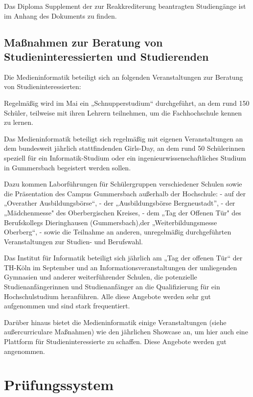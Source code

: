Das Diploma Supplement der zur Reakkrediterung beantragten Studiengänge
ist im Anhang des Dokuments zu finden.

\section{Maßnahmen zur Beratung von Studieninteressierten und
Studierenden}\label{mauxdfnahmen-zur-beratung-von-studieninteressierten-und-studierenden}

Die Medieninformatik beteiligt sich an folgenden Veranstaltungen zur
Beratung von Studieninteressierten:

Regelmäßig wird im Mai ein „Schnupperstudium`` durchgeführt, an dem rund
150 Schüler, teilweise mit ihren Lehrern teilnehmen, um die
Fachhochschule kennen zu lernen.

Das Medieninformatik beteiligt sich regelmäßig mit eigenen
Veranstaltungen an dem bundesweit jährlich stattfindenden Girls-Day, an
dem rund 50 Schülerinnen speziell für ein Informatik-Studium oder ein
ingenieurwissenschaftliches Studium in Gummersbach begeistert werden
sollen.

Dazu kommen Laborführungen für Schülergruppen verschiedener Schulen
sowie die Präsentation des Campus Gummersbach außerhalb der Hochschule:
- auf der „Overather Ausbildungsbörse``, - der „Ausbildungsbörse
Bergneustadt'', - der „Mädchenmesse" des Oberbergischen Kreises, - dem
„Tag der Offenen Tür" des Berufskollegs Dieringhausen (Gummersbach),der
„Weiterbildungsmesse Oberberg``, - sowie die Teilnahme an anderen,
unregelmäßig durchgeführten Veranstaltungen zur Studien- und Berufswahl.

Das Institut für Informatik beteiligt sich jährlich am „Tag der offenen
Tür`` der TH-Köln im September und an Informationsveranstaltungen der
umliegenden Gymnasien und anderer weiterführender Schulen, die
potenzielle Studienanfängerinnen und Studienanfänger an die
Qualifizierung für ein Hochschulstudium heranführen. Alle diese Angebote
werden sehr gut aufgenommen und sind stark frequentiert.

Darüber hinaus bietet die Medieninformatik einige Veranstaltungen (siehe
außercurriculare Maßnahmen) wie den jährlichen Showcase an, um hier auch
eine Plattform für Studieninteressierte zu schaffen. Diese Angebote
werden gut angenommen.

\chapter{Prüfungssystem}\label{pruxfcfungssystem}

